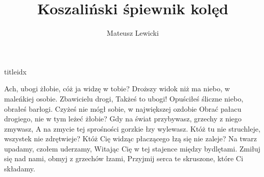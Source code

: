 \documentclass[a5paper, portrait, 12pt]{mwart}
\begin{document}
\author{Mateusz Lewicki}
\title{Koszaliński śpiewnik kolęd}
%

\begin{songs}{titleidx}


\beginverse
Ach, ubogi żłobie, cóż ja widzę w tobie?
Droższy widok niż ma niebo, w maleńkiej osobie.
\endverse
\beginverse
Zbawicielu drogi, Takżeś to ubogi!
Opuściłeś śliczne niebo, obrałeś barłogi.
\endverse
\beginverse
Czyżeś nie mógł sobie, w największej ozdobie Obrać
pałacu drogiego, nie w tym leżeć żłobie?
\endverse
\beginverse
Gdy na świat przybywasz, grzechy z niego zmywasz,
A na zmycie tej sprośności gorzkie łzy wylewasz.
\endverse
\beginverse
Któż tu nie struchleje, wszystek nie zdrętwieje?
Któż Cię widząc płaczącego łzą się nie zaleje?
\endverse
\beginverse
Na twarz upadamy, czołem uderzamy,
Witając Cię w tej stajence między bydlętami.
\endverse
\beginverse
Zmiłuj się nad nami, obmyj z grzechów łzami,
Przyjmij serca te skruszone, które Ci składamy.
\endverse
\endsong



\end{songs}
\end{document}
